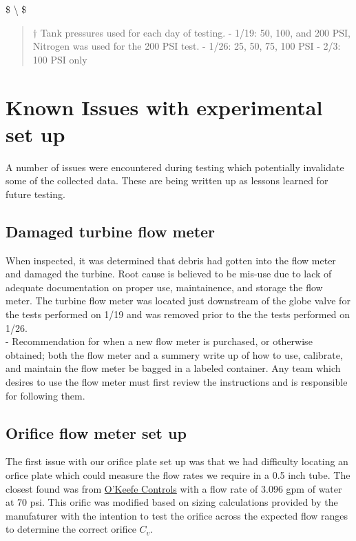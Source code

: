 \documentclass[11pt]{article}
\begin{document}
\$ \textbackslash{} \$

\begin{quote}
\(\dagger\) Tank pressures used for each day of testing. - 1/19: 50,
100, and 200 PSI, Nitrogen was used for the 200 PSI test. - 1/26: 25,
50, 75, 100 PSI - 2/3: 100 PSI only
\end{quote}

    \section{Known Issues with experimental set
up}\label{known-issues-with-experimental-set-up}

A number of issues were encountered during testing which potentially
invalidate some of the collected data. These are being written up as
lessons learned for future testing.

\subsection{Damaged turbine flow
meter}\label{damaged-turbine-flow-meter}

When inspected, it was determined that debris had gotten into the flow
meter and damaged the turbine. Root cause is believed to be mis-use due
to lack of adequate documentation on proper use, maintainence, and
storage the flow meter. The turbine flow meter was located just
downstream of the globe valve for the tests performed on 1/19 and was
removed prior to the the tests performed on 1/26.\\
- Recommendation for when a new flow meter is purchased, or otherwise
obtained; both the flow meter and a summery write up of how to use,
calibrate, and maintain the flow meter be bagged in a labeled container.
Any team which desires to use the flow meter must first review the
instructions and is responsible for following them.

\subsection{Orifice flow meter set up}\label{orifice-flow-meter-set-up}

The first issue with our orifice plate set up was that we had difficulty
locating an orfice plate which could measure the flow rates we require
in a 0.5 inch tube. The closest found was from
\href{http://catalog.okeefecontrols.com/item/precision-metal-orifices-npt-connections/precision-metal-orifices-npt-adapter/h-125-br}{O'Keefe
Controls} with a flow rate of 3.096 gpm of water at 70 psi. This orific
was modified based on sizing calculations provided by the manufaturer
with the intention to test the orifice across the expected flow ranges
to determine the correct orifice \(C_v\).
\end{document}
